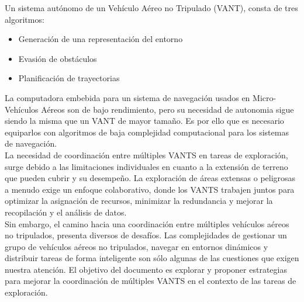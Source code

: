 \documentclass[sigconf]{acmart}
\begin{document}
Un sistema autónomo de un Vehículo Aéreo no Tripulado (VANT), consta de tres algoritmos:

\begin{itemize}
\item Generación de una representación del entorno
\item Evasión de obstáculos
\item Planificación de trayectorias
\end{itemize}

La computadora embebida para un sistema de navegación usados en Micro-Vehículos Aéreos son de bajo rendimiento, pero su necesidad de autonomia sigue siendo la misma que un VANT de mayor tamaño. Es por ello que es necesario equiparlos con algoritmos de baja complejidad computacional para los sistemas de navegación.\\

La necesidad de coordinación entre múltiples VANTS en tareas de exploración, surge debido a las limitaciones individuales en cuanto a la extensión de terreno que pueden cubrir y su desempeño. La exploración de áreas extensas o peligrosas a menudo exige un enfoque colaborativo, donde los VANTS trabajen juntos para optimizar la asignación de recursos, minimizar la redundancia y mejorar la recopilación y el análisis de datos.\\ %

Sin embargo, el camino hacia una coordinación entre múltiples vehículos aéreos no tripulados, presenta diversos de desafíos. Las complejidades de gestionar un grupo de vehículos aéreos no tripulados, navegar en entornos dinámicos y distribuir tareas de forma inteligente son sólo algunas de las cuestiones que exigen nuestra atención. El objetivo del documento es explorar y proponer estrategias para mejorar la coordinación de múltiples VANTS en el contexto de las tareas de exploración.\\

\end{document}
